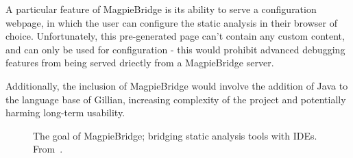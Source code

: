 A particular feature of MagpieBridge is its ability to serve a configuration
webpage, in which the user can configure the static analysis in their browser
of choice. Unfortunately, this pre-generated page can't contain any custom
content, and can only be used for configuration - this would prohibit advanced
debugging features from being served driectly from a MagpieBridge server.

Additionally, the inclusion of MagpieBridge would involve the addition of Java
to the language base of Gillian, increasing complexity of the project and
potentially harming long-term usability.


\begin{figure}
  \noindent
  \caption{
    The goal of MagpieBridge; bridging static analysis tools with IDEs.
    From~\cite{magpiebridge-repo}.
  }
  \label{fig:webview-example}
\end{figure}
